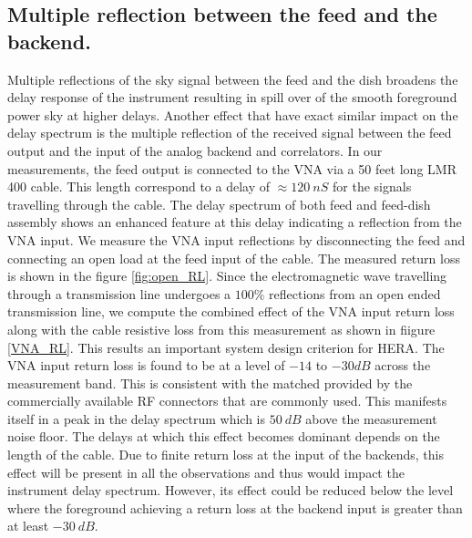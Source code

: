 \documentclass[twocolumn]{emulateapj}
\begin{document}
\subsection{\textbf{Multiple reflection between the feed and the backend.}}
Multiple reflections of the sky signal between the feed and the dish broadens the delay response of the instrument resulting in spill over of the smooth foreground power sky at higher delays. Another effect that have exact similar impact on the delay spectrum is the multiple reflection of the received signal between the feed output and the input of the analog backend and correlators. In our measurements, the feed output is connected to the VNA via a 50 feet long LMR 400 cable. This length correspond to a delay of $\approx 120~nS$ for the signals travelling through the cable. The delay spectrum of both feed and feed-dish assembly shows an enhanced feature at this delay indicating a reflection from the VNA input. We measure the VNA input reflections by disconnecting the feed and connecting an open load at the feed input of the cable. The measured return loss is shown in the figure \ref{fig:open_RL}. Since the electromagnetic wave travelling through a transmission line undergoes a $100\%$ reflections from an open ended transmission line, we compute the combined effect of the VNA input return loss along with the cable resistive loss from this measurement as shown in fiigure \ref{VNA_RL}. This results an important system design criterion for HERA. The VNA input return loss is found to be at a level of $-14$ to $-30dB$ across the measurement band. This is consistent with the matched provided by the commercially available RF connectors that are commonly used. This manifests itself in a peak in the delay spectrum which is $50~dB$ above the measurement noise floor. The delays at which this effect becomes dominant depends on the length of the cable. Due to finite return loss at the input of the backends, this effect will be present in all the observations and thus would impact the instrument delay spectrum. However, its effect could be reduced below the level where the foreground  achieving a return loss at the backend input is greater than at least $-30~dB$. 
\end{document}

